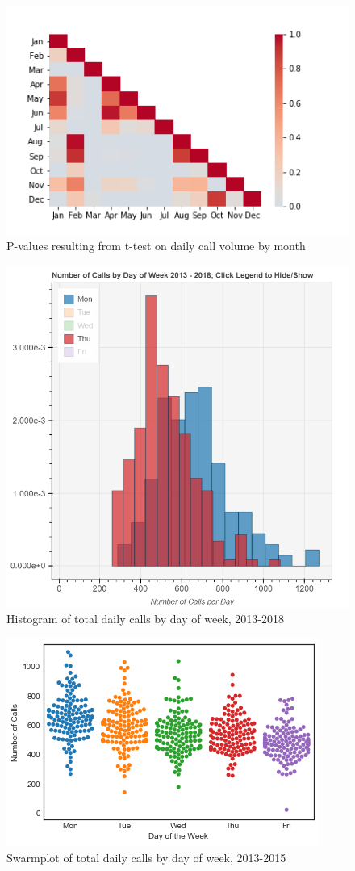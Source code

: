 \documentclass{article}
\begin{document}
\begin{figure}[p]
	\includegraphics[scale=.5]{Heatmap.png}
	\caption{P-values resulting from t-test on daily call volume by month}
\end{figure}


\begin{figure}[p]
	\includegraphics[scale=.35]{daily_calls.png}
	\caption{Histogram of total daily calls by day of week, 2013-2018}
\end{figure}

\begin{figure}[p]
	\includegraphics[scale=.6]{swarm.png}
	\caption{Swarmplot of total daily calls by day of week, 2013-2015}
\end{figure}
\end{document}
